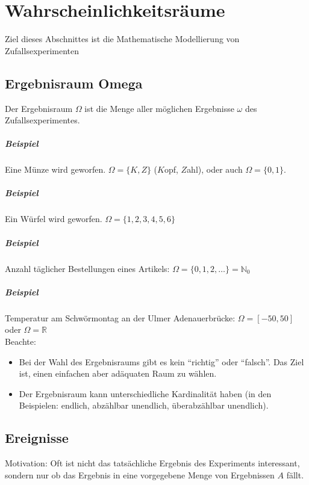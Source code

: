 \chapter{Wahrscheinlichkeitsräume}
Ziel dieses Abschnittes ist die Mathematische Modellierung von Zufallsexperimenten

\section{Ergebnisraum Omega}
Der Ergebnisraum $\Omega$ ist die Menge aller möglichen Ergebnisse $\omega$ des
Zufallsexperimentes.

\paragraph{Beispiel} Eine Münze wird geworfen. $\Omega = \{K, Z\}$ ($K$opf, $Z$ahl), oder auch
$\Omega = \{0, 1\}$.

\paragraph{Beispiel} Ein Würfel wird geworfen. $\Omega = \{1,2,3,4,5,6\}$

\paragraph{Beispiel} Anzahl täglicher Bestellungen eines Artikels:
$\Omega = \{0,1,2,\dots\} = \mathbb{N}_0$

\paragraph{Beispiel} Temperatur am Schwörmontag an der Ulmer Adenauerbrücke:
$\Omega = [-50,50]$ oder $\Omega = \mathbb{R}$
\\

Beachte:
\begin{itemize}
    \item Bei der Wahl des Ergebnisraums gibt es kein \enquote{richtig} oder \enquote{falsch}.
          Das Ziel ist, einen einfachen aber adäquaten Raum zu wählen.
    \item Der Ergebnisraum kann unterschiedliche Kardinalität haben
          (in den Beispielen: endlich, abzählbar unendlich, überabzählbar unendlich).
\end{itemize}

\section{Ereignisse}
Motivation: Oft ist nicht das tatsächliche Ergebnis des Experiments interessant, sondern nur
ob das Ergebnis in eine vorgegebene Menge von Ergebnissen $A$ fällt.

